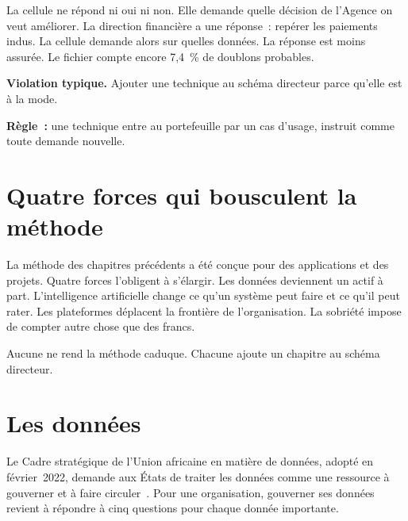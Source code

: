 La cellule ne répond ni oui ni non. Elle demande quelle décision de l'Agence on veut améliorer. La direction
financière a une réponse~: repérer les paiements indus. La cellule demande alors sur quelles données. La réponse
est moins assurée. Le fichier compte encore 7,4~\% de doublons probables.

\begin{boxalert}
\textbf{Violation typique.} Ajouter une technique au schéma directeur parce qu'elle est à la mode.

\smallskip
\textbf{Règle~:} une technique entre au portefeuille par un cas d'usage, instruit comme toute demande
nouvelle.
\end{boxalert}

\section{Quatre forces qui bousculent la méthode}
\label{sec:c15-forces}

La méthode des chapitres précédents a été conçue pour des applications et des projets. Quatre forces
l'obligent à s'élargir. Les données deviennent un actif à part. L'intelligence artificielle change ce qu'un
système peut faire et ce qu'il peut rater. Les plateformes déplacent la frontière de l'organisation. La
sobriété impose de compter autre chose que des francs.

Aucune ne rend la méthode caduque. Chacune ajoute un chapitre au schéma directeur.

\section{Les données}
\label{sec:c15-donnees}

Le Cadre stratégique de l'Union africaine en matière de données, adopté en février~2022, demande aux États de
traiter les données comme une ressource à gouverner et à faire circuler~\cite{ua2022donnees}. Pour une
organisation, gouverner ses données revient à répondre à cinq questions pour chaque donnée importante.

